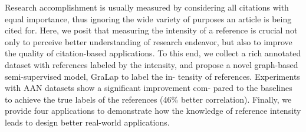 Research accomplishment is usually measured by considering all citations with equal importance, thus ignoring the wide variety of purposes an article is being cited for. Here, we posit that measuring the intensity of a reference is crucial not only to perceive better understanding of research endeavor, but also to improve the quality of citation-based applications. To this end, we collect a rich annotated dataset with references labeled by the intensity, and propose a novel graph-based semi-supervised model, GraLap to label the in- tensity of references. Experiments with AAN datasets show a significant improvement com- pared to the baselines to achieve the true labels of the references (46\% better correlation). Finally, we provide four applications to demonstrate how the knowledge of reference intensity leads to design better real-world applications.
